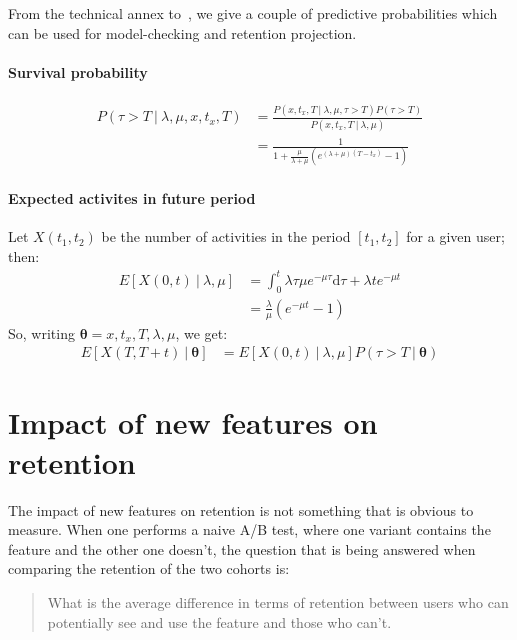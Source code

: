\documentclass{tufte-book}
\begin{document}
From the technical annex to~\cite{Abe2009}, we give a couple of
predictive probabilities which can be used for model-checking and
retention projection.

\paragraph{Survival probability}
\label{par:survivalprobability}

\begin{align*}
  P(\tau > T \ | \ \lambda, \mu, x, t_x, T)
  & = \frac{P(x, t_x, T \ | \ \lambda, \mu, \tau>T) P(\tau>T)}{
    P(x, t_x, T\ |\ \lambda, \mu)}\\
  & = \frac{1}{1+\frac{\mu}{\lambda+\mu}\left(
    e^{(\lambda+\mu)(T-t_x)}-1\right)}
\end{align*}


\paragraph{Expected activites in future period}
\label{par:expectedactivtiesinperiod0t}

Let $X(t_1, t_2)$ be the number of activities in the period $[t_1,t_2]$ for a
given user; then:
\begin{align*}
  E[X(0,t)\ |\ \lambda, \mu]
  & = \int_0^t \lambda\tau\mu e^{-\mu \tau} \mathrm{d}\tau
    + \lambda t e^{-\mu t} \\
  & = \frac{\lambda}{\mu} \left(e^{-\mu t} - 1\right)
\end{align*}
So, writing $\boldsymbol\theta = x, t_x, T, \lambda, \mu$, we get:
\begin{align*}
  E[X(T,T+t) \ | \ \boldsymbol\theta]
  & = E[X(0,t)\ | \ \lambda,\mu]
    P(\tau >T \ | \ \boldsymbol\theta)
\end{align*}



  
\section{Impact of new features on retention}

The impact of new features on retention is not something that is obvious to
measure. When one performs a naive A/B test, where one variant contains the
feature and the other one doesn't, the question that is being answered when
comparing the retention of the two cohorts is:

\begin{quotation}
	What is the average difference in terms of retention between users who
	can potentially see and use the feature and those who can't.
\end{quotation}
\end{document}
